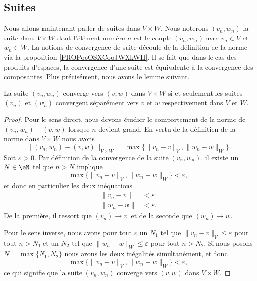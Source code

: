 \subsection{Suites}

Nous allons maintenant parler de suites dans $V\times W$. Nous noterons $(v_n,w_n)$ la suite dans $V\times W$ dont l'élément numéro $n$ est le couple $(v_n,w_n)$ avec $v_n\in V$ et $w_n\in W$. La notions de convergence de suite découle de la définition de la norme via la proposition \ref{PROPooOSXCooJWXkWH}. Il se fait que dans le cas des produits d'espaces, la convergence d'une suite est équivalente à la convergence des composantes. Plus précisément, nous avons le lemme suivant.
\begin{lemma}       \label{LemCvVxWcvVW}
    La suite $(v_n,w_n)$ converge vers $(v,w)$ dans $V\times W$ si et seulement les suites $(v_n)$ et $(w_n)$ convergent séparément vers $v$ et $w$ respectivement dans $V$ et $W$.
\end{lemma}

\begin{proof}
    Pour le sens direct, nous devons étudier le comportement de la norme de $(v_n,w_n)-(v,w)$ lorsque $n$ devient grand. En vertu de la définition de la norme dans $V\times W$ nous avons
    \begin{equation}
        \Big\| (v_n,w_n)-(v,w) \Big\|_{V\times W}=\max\big\{ \| v_n-v \|_V,\| w_n-w \|_W \big\}.
    \end{equation}
    Soit $\varepsilon>0$. Par définition de la convergence de la suite $(v_n,w_n)$, il existe un $N\in\eN$ tel que $n>N$ implique
    \begin{equation}
        \max\big\{ \| v_n-v \|_V,\| w_n-w \|_W \big\}<\varepsilon,
    \end{equation}
    et donc en particulier les deux inéquations
    \begin{subequations}
        \begin{align}
            \| v_n-v \|&<\varepsilon\\
            \| w_n-w \|&<\varepsilon.
        \end{align}
    \end{subequations}
    De la première, il ressort que $(v_n)\to v$, et de la seconde que $(w_n)\to w$.

    Pour le sens inverse, nous avons pour tout $\varepsilon$ un $N_1$ tel que $\| v_n-v \|_V\leq\varepsilon$ pour tout $n>N_1$ et un $N_2$ tel que $\| w_n-w \|_W\leq\varepsilon$ pour tout $n>N_2$. Si nous posons $N=\max\{ N_1,N_2 \}$ nous avons les deux inégalités simultanément, et donc
    \begin{equation}
        \max\big\{ \| v_n-v \|_V,\| w_n-w \|_W \big\}<\varepsilon,
    \end{equation}
    ce qui signifie que la suite $(v_n,w_n)$ converge vers $(v,w)$ dans $V\times W$.
\end{proof}

